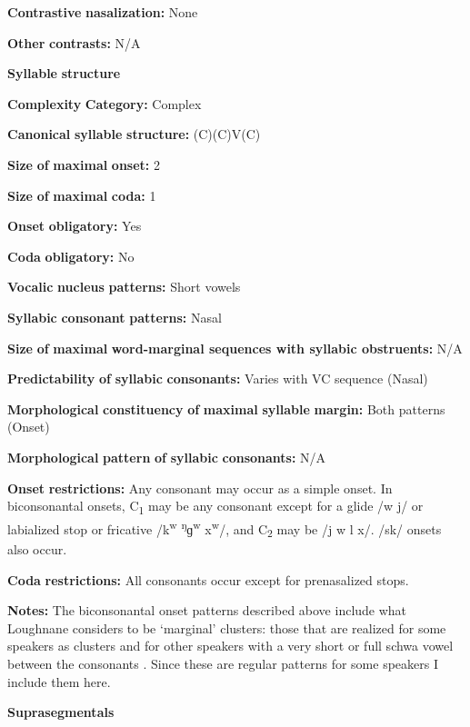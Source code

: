 \begin{styleBody}
\textbf{Contrastive} \textbf{nasalization:} None

\textbf{Other} \textbf{contrasts:} N/A

\textbf{Syllable} \textbf{structure}

\textbf{Complexity} \textbf{Category:} Complex

\textbf{Canonical} \textbf{syllable} \textbf{structure:} (C)(C)V(C) \citep[63-73]{Loughnane2009}

\textbf{Size} \textbf{of} \textbf{maximal} \textbf{onset:} 2

\textbf{Size} \textbf{of} \textbf{maximal} \textbf{coda:} 1

\textbf{Onset} \textbf{obligatory:} Yes

\textbf{Coda} \textbf{obligatory:} No

\textbf{Vocalic} \textbf{nucleus} \textbf{patterns:} Short vowels

\textbf{Syllabic} \textbf{consonant} \textbf{patterns:} Nasal

\textbf{Size} \textbf{of} \textbf{maximal} \textbf{word{}-marginal sequences with syllabic obstruents:} N/A

\textbf{Predictability} \textbf{of} \textbf{syllabic} \textbf{consonants:} Varies with VC sequence (Nasal)

\textbf{Morphological} \textbf{constituency} \textbf{of} \textbf{maximal} \textbf{syllable} \textbf{margin:} Both patterns (Onset)

\textbf{Morphological} \textbf{pattern} \textbf{of} \textbf{syllabic} \textbf{consonants:} N/A

\textbf{Onset} \textbf{restrictions:} Any consonant may occur as a simple onset. In biconsonantal onsets, C\textsubscript{1} may be any consonant except for a glide /w j/ or labialized stop or fricative /k\textsuperscript{w} \textsuperscript{ŋ}ɡ\textsuperscript{w} x\textsuperscript{w}/, and C\textsubscript{2} may be /j w l x/. /sk/ onsets also occur.

\textbf{Coda} \textbf{restrictions:} All consonants occur except for prenasalized stops.

\textbf{Notes:} The biconsonantal onset patterns described above include what Loughnane considers to be ‘marginal’ clusters: those that are realized for some speakers as clusters and for other speakers with a very short or full schwa vowel between the consonants \citep[64-5]{Loughnane2009}. Since these are regular patterns for some speakers I include them here.

\textbf{Suprasegmentals}


\end{styleBody}
